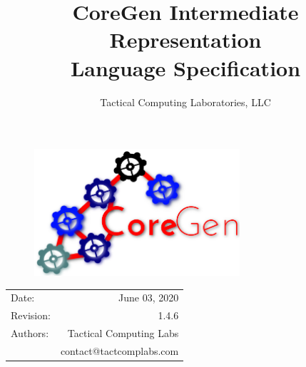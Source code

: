 \documentclass{article}
\title{CoreGen Intermediate Representation\\Language Specification} %
\author{Tactical Computing Laboratories, LLC} %
\date{} %
\begin{document}
\begin{figure}
\begin{center}
\includegraphics[width=3in]{figures/coregen-logo.png} %
\end{center}
\end{figure}

\maketitle %
\thispagestyle{fancy} %

\begin{center}
\begin{tabular}{l r}
Date: & June 03, 2020 \\ %
Revision: & 1.4.6 \\         %
Authors: & Tactical Computing Labs\\ %
& contact@tactcomplabs.com\\
\end{tabular}
\end{center}


\clearpage
\tableofcontents
\clearpage


\clearpage
\listoffigures
\lstlistoflistings
\listoftables
\clearpage

\end{document}
